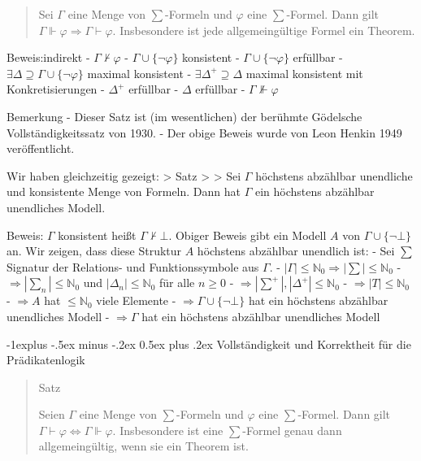 \documentclass[a4paper]{article}
\makeatletter
\renewcommand{\subsection}{\@startsection{subsection}{2}{0mm}%
                {-1explus -.5ex minus -.2ex}%
                {0.5ex plus .2ex}%
                {\normalfont\normalsize\bfseries}}
\makeatother
\begin{document}
\begin{multicols}{3}
\begin{quote}
    Sei $\Gamma$ eine Menge von $\sum$-Formeln und $\varphi$ eine
    $\sum$-Formel. Dann gilt
    $\Gamma\Vdash\varphi \Rightarrow \Gamma\vdash\varphi$. Insbesondere ist
    jede allgemeingültige Formel ein Theorem.
  \end{quote}

  Beweis:indirekt - $\Gamma\not\vdash\varphi$ -
  $\Gamma\cup\{\lnot\varphi\}$ konsistent - $\Gamma\cup\{\lnot\varphi\}$
  erfüllbar - $\exists\Delta\supseteq\Gamma\cup\{\lnot\varphi\}$ maximal
  konsistent - $\exists\Delta^+\supseteq\Delta$ maximal konsistent mit
  Konkretisierungen - $\Delta^+$ erfüllbar - $\Delta$ erfüllbar -
  $\Gamma\not\Vdash\varphi$

  Bemerkung - Dieser Satz ist (im wesentlichen) der berühmte Gödelsche
  Vollständigkeitssatz von 1930. - Der obige Beweis wurde von Leon Henkin
  1949 veröffentlicht.

  Wir haben gleichzeitig gezeigt: \textgreater{} Satz \textgreater{}
  \textgreater{} Sei $\Gamma$ höchstens abzählbar unendliche und
  konsistente Menge von Formeln. Dann hat $\Gamma$ ein höchstens abzählbar
  unendliches Modell.

  Beweis: $\Gamma$ konsistent heißt $\Gamma\not\vdash\bot$. Obiger Beweis
  gibt ein Modell $A$ von $\Gamma\cup\{\lnot\bot\}$ an. Wir zeigen, dass
  diese Struktur $A$ höchstens abzählbar unendlich ist: - Sei $\sum$
  Signatur der Relations- und Funktionssymbole aus $\Gamma$. -
  $|\Gamma|\leq \mathbb{N}_0 \Rightarrow |\sum|\leq \mathbb{N}_0$ -
  $\Rightarrow |\sum_n|\leq \mathbb{N}_0$ und
  $|\Delta_n|\leq \mathbb{N}_0$ für alle $n\geq 0$ -
  $\Rightarrow |\sum^+|,|\Delta^+| \leq\mathbb{N}_0$ -
  $\Rightarrow |T| \leq\mathbb{N}_0$ - $\Rightarrow A$ hat
  $\leq\mathbb{N}_0$ viele Elemente -
  $\Rightarrow \Gamma\cup\{\lnot\bot\}$ hat ein höchstens abzählbar
  unendliches Modell - $\Rightarrow \Gamma$ hat ein höchstens abzählbar
  unendliches Modell

  \subsection{Vollständigkeit und Korrektheit für die
    Prädikatenlogik}\label{vollstuxe4ndigkeit-und-korrektheit-fuxfcr-die-pruxe4dikatenlogik}

  \begin{quote}
    Satz

    Seien $\Gamma$ eine Menge von $\sum$-Formeln und $\varphi$ eine
    $\sum$-Formel. Dann gilt
    $\Gamma\vdash\varphi\Leftrightarrow \Gamma\Vdash\varphi$. Insbesondere
    ist eine $\sum$-Formel genau dann allgemeingültig, wenn sie ein Theorem
    ist.
  \end{quote}


\end{multicols}
\end{document}
